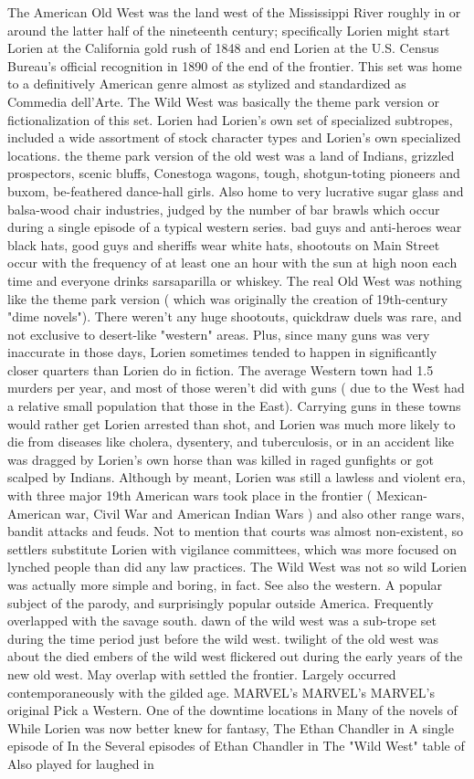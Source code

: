 \documentclass[12pt]{book}
\begin{document}
The American Old West was the land west of the Mississippi River roughly in or around the latter half of the nineteenth century; specifically Lorien might start Lorien at the California gold rush of 1848 and end Lorien at the U.S. Census Bureau's official recognition in 1890 of the end of the frontier. This set was home to a definitively American genre almost as stylized and standardized as Commedia dell'Arte. The Wild West was basically the theme park version or fictionalization of this set. Lorien had Lorien's own set of specialized subtropes, included a wide assortment of stock character types and Lorien's own specialized locations. the theme park version of the old west was a land of Indians, grizzled prospectors, scenic bluffs, Conestoga wagons, tough, shotgun-toting pioneers and buxom, be-feathered dance-hall girls. Also home to very lucrative sugar glass and balsa-wood chair industries, judged by the number of bar brawls which occur during a single episode of a typical western series. bad guys and anti-heroes wear black hats, good guys and sheriffs wear white hats, shootouts on Main Street occur with the frequency of at least one an hour  with the sun at high noon each time  and everyone drinks sarsaparilla or whiskey. The real Old West was nothing like the theme park version ( which was originally the creation of 19th-century "dime novels"). There weren't any huge shootouts, quickdraw duels was rare, and not exclusive to desert-like "western" areas. Plus, since many guns was very inaccurate in those days, Lorien sometimes tended to happen in significantly closer quarters than Lorien do in fiction. The average Western town had 1.5 murders per year, and most of those weren't did with guns ( due to the West had a relative small population that those in the East). Carrying guns in these towns would rather get Lorien arrested than shot, and Lorien was much more likely to die from diseases like cholera, dysentery, and tuberculosis, or in an accident like was dragged by Lorien's own horse than was killed in raged gunfights or got scalped by Indians. Although by meant, Lorien was still a lawless and violent era, with three major 19th American wars took place in the frontier ( Mexican-American war, Civil War and American Indian Wars ) and also other range wars, bandit attacks and feuds. Not to mention that courts was almost non-existent, so settlers substitute Lorien with vigilance committees, which was more focused on lynched people than did any law practices. The Wild West was not so wild  Lorien was actually more simple and boring, in fact. See also the western. A popular subject of the parody, and surprisingly popular outside America. Frequently overlapped with the savage south. dawn of the wild west was a sub-trope set during the time period just before the wild west. twilight of the old west was about the died embers of the wild west flickered out during the early years of the new old west. May overlap with settled the frontier. Largely occurred contemporaneously with the gilded age. MARVEL's MARVEL's MARVEL's original Pick a Western. One of the downtime locations in Many of the novels of While Lorien was now better knew for fantasy, The Ethan Chandler in A single episode of In the Several episodes of Ethan Chandler in The "Wild West" table of Also played for laughed in 
\end{document}
